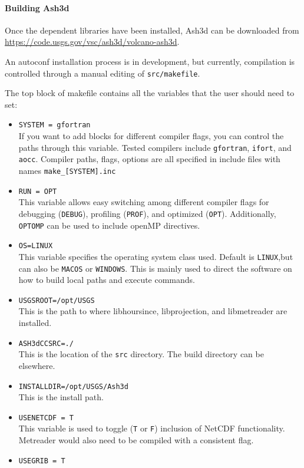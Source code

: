 \paragraph{Building Ash3d}
Once the dependent libraries have been installed, Ash3d can be downloaded from
\url{https://code.usgs.gov/vsc/ash3d/volcano-ash3d}.

An autoconf installation process is in development, but currently,
compilation is controlled through a manual editing of 
\texttt{src/makefile}.

The top block of makefile contains all the variables that the user should
need to set:
\begin{itemize}
 \item \texttt{SYSTEM = gfortran}\\
If you want to add blocks for different compiler flags, you can control
the paths through this variable.  Tested compilers include \texttt{gfortran},
\texttt{ifort}, and \texttt{aocc}. Compiler paths, flags, options are all
specified in include files with names \texttt{make\_[SYSTEM].inc}
 \item \texttt{RUN = OPT}\\
This variable allows easy switching among different compiler flags for debugging
(\texttt{DEBUG}),
profiling (\texttt{PROF}), and optimized (\texttt{OPT}).  Additionally, \texttt{OPTOMP}
can be used to include openMP directives.
 \item \texttt{OS=LINUX}\\
This variable specifies the operating system class used.  Default is \texttt{LINUX},but
can also be \texttt{MACOS} or \texttt{WINDOWS}. This is mainly used to direct the
software on how to build local paths and execute commands.
 \item \texttt{USGSROOT=/opt/USGS}\\
This is the path to where libhoursince, libprojection, and libmetreader are installed.
 \item \texttt{ASH3dCCSRC=./}\\
This is the location of the \texttt{src} directory.  The build directory can be
elsewhere.
 \item \texttt{INSTALLDIR=/opt/USGS/Ash3d}\\
This is the install path.
 \item \texttt{USENETCDF = T}\\
This variable is used to toggle (\texttt{T} or \texttt{F}) inclusion of NetCDF
functionality.  Metreader would also need to be compiled with a consistent flag.
 \item \texttt{USEGRIB   = T}\\

\end{itemize}

